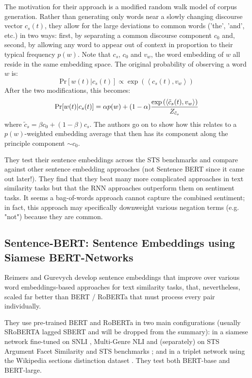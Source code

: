 \documentclass[11pt]{article}
\begin{document}
The motivation for their approach is a modified random walk model of corpus generation. Rather than generating only words near a slowly changing discourse vector $c_s(t)$, they allow for the large deviations to common words ('the', 'and', etc.) in two ways: first, by separating a common discourse component $c_0$ and, second, by allowing any word to appear out of context in proportion to their typical frequency $p(w)$. Note that $c_s$, $c_0$ and $v_w$, the word embedding of $w$ all reside in the same embedding space. The original probability of observing a word $w$ is:
\begin{equation}
  \mathrm{Pr}[w(t)|c_s(t)] \propto \exp\left(\left< c_s(t), v_w \right> \right)
\end{equation}
After the two modifications, this becomes:
\begin{equation}
  \mathrm{Pr}[w(t)|c_s(t)] = \alpha p(w) + (1-\alpha) {\exp\left(\left< \tilde c_s(t), v_w \right> \right) \over Z_{\tilde c_s}}
\end{equation}
where $\tilde c_s = \beta c_0 + (1-\beta)c_s$. The authors go on to show how this relates to a $p(w)$-weighted embedding average that then has its component along the principle component $\sim c_0$.

They test their sentence embeddings across the STS benchmarks and compare against other sentence embedding approaches (not Sentence BERT since it came out later!). They find that they beat many more complicated approaches in text similarity tasks but that the RNN approaches outperform them on sentiment tasks. It seems a bag-of-words approach cannot capture the combined sentiment; in fact, this approach may specifically downweight various negation terms (e.g. "not") because they are common.

\subsection{Sentence-BERT: Sentence Embeddings using Siamese BERT-Networks \cite{Reimers2019}}

Reimers and Gurevych develop sentence embeddings that improve over various word embeddings-based approaches for text similarity tasks, that, nevertheless, scaled far better than BERT / RoBERTa that must process every pair individually. 

They use pre-trained BERT and RoBERTa in two main configurations (usually SRoBERTA lagged SBERT and will be dropped from the summary): in a siamese network fine-tuned on SNLI \cite{Bowman2015}, Multi-Genre NLI \cite{Williams2018} and (separately) on STS Argument Facet Similarity \cite{Misra2016} and STS benchmarks \cite{Cer2017}; and in a triplet network using the Wikipedia sections distinction dataset \cite{Dor2018}. They test both BERT-base and BERT-large.
\end{document}
